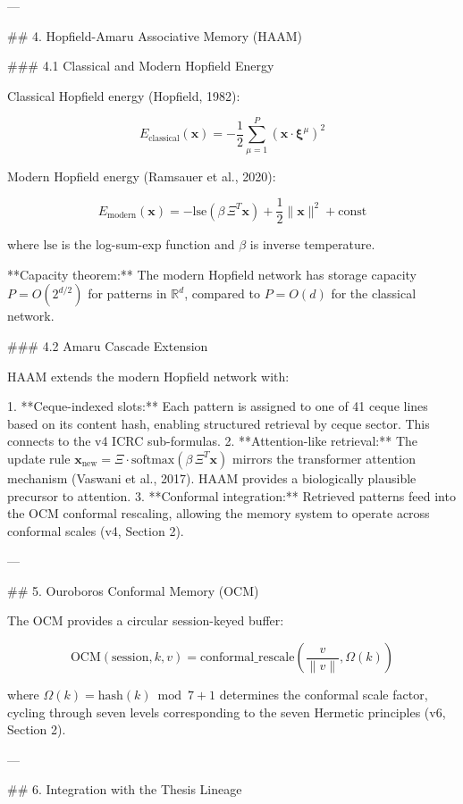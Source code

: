 ---

## 4. Hopfield-Amaru Associative Memory (HAAM)

### 4.1 Classical and Modern Hopfield Energy

Classical Hopfield energy (Hopfield, 1982):

\[
E_{\text{classical}}(\mathbf{x}) = -\frac{1}{2} \sum_{\mu=1}^{P} (\mathbf{x} \cdot \boldsymbol{\xi}^\mu)^2
\]

Modern Hopfield energy (Ramsauer et al., 2020):

\[
E_{\text{modern}}(\mathbf{x}) = -\text{lse}(\beta \, \Xi^T \mathbf{x}) + \frac{1}{2}\|\mathbf{x}\|^2 + \text{const}
\]

where \( \text{lse} \) is the log-sum-exp function and \( \beta \) is inverse temperature.

**Capacity theorem:** The modern Hopfield network has storage capacity \( P = O(2^{d/2}) \) for patterns in \( \mathbb{R}^d \), compared to \( P = O(d) \) for the classical network.

### 4.2 Amaru Cascade Extension

HAAM extends the modern Hopfield network with:

1. **Ceque-indexed slots:** Each pattern is assigned to one of 41 ceque lines based on its content hash, enabling structured retrieval by ceque sector. This connects to the v4 ICRC sub-formulas.
2. **Attention-like retrieval:** The update rule \( \mathbf{x}_{\text{new}} = \Xi \cdot \text{softmax}(\beta \, \Xi^T \mathbf{x}) \) mirrors the transformer attention mechanism (Vaswani et al., 2017). HAAM provides a biologically plausible precursor to attention.
3. **Conformal integration:** Retrieved patterns feed into the OCM conformal rescaling, allowing the memory system to operate across conformal scales (v4, Section 2).

---

## 5. Ouroboros Conformal Memory (OCM)

The OCM provides a circular session-keyed buffer:

\[
\text{OCM}(\text{session}, k, v) = \text{conformal\_rescale}\left(\frac{v}{\|v\|}, \Omega(k)\right)
\]

where \( \Omega(k) = \text{hash}(k) \bmod 7 + 1 \) determines the conformal scale factor, cycling through seven levels corresponding to the seven Hermetic principles (v6, Section 2).

---

## 6. Integration with the Thesis Lineage

